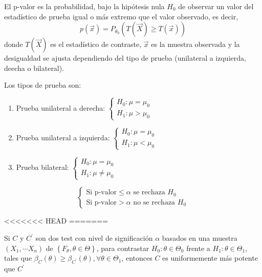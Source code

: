 \begin{definición} [p-valor]
    El p-valor es la probabilidad, bajo la hipótesis nula $H_0$ de observar un valor del estadístico de prueba igual o más extremo que el valor observado, es decir,
    $$p(\vec{x}) = P_{\theta_0}(T(\vec{X}) \geq T(\vec{x}))$$
    donde $T(\vec{X})$ es el estadístico de contraste, $\vec{x}$ es la muestra observada y la desigualdad se ajusta dependiendo del tipo de prueba (unilateral a izquierda, deecha o bilateral).
\end{definición}

\begin{observación}
    Los tipos de prueba son:
    \begin{enumerate}
        \item Prueba unilateral a derecha: $\begin{cases} H_0: \mu = \mu_0 \\ H_1: \mu > \mu_0 \end{cases}$
        \item Prueba unilateral a izquierda: $\begin{cases} H_0: \mu = \mu_0 \\ H_1: \mu < \mu_0 \end{cases}$
        \item Prueba bilateral: $\begin{cases} H_0: \mu = \mu_0 \\ H_1: \mu \neq \mu_0 \end{cases}$
    \end{enumerate}
\end{observación}



\begin{observación}
    $$\begin{cases}
        \text{Si p-valor}  \leq \alpha \text{ se rechaza } H_0 \\
        \text{Si p-valor}  > \alpha \text{ no se rechaza } H_0
    \end{cases}$$
\end{observación}

<<<<<<< HEAD
=======
\begin{proposición} 
Si $C$ y $C^{\prime}$ son dos test con nivel de significación $\alpha$ basados en una muestra $\left(X_{1}, \cdots X_{n}\right)$ de $\left\{F_{\theta}, \theta \in \Theta\right\}$, para contrastar $H_{0}: \theta \in \Theta_{0}$ frente a $H_{1}: \theta \in \Theta_{1}$, tales que $\beta_{C}(\theta) \geq \beta_{C^{\prime}}(\theta), \forall \theta \in \Theta_{1}$, entonces $C$ es uniformemente más potente que $C^{\prime}$    
\end{proposición}



